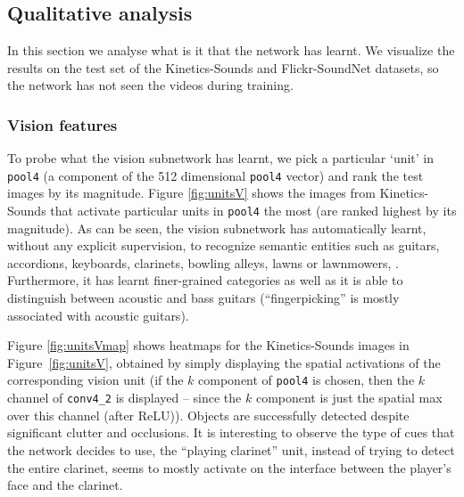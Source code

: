 \documentclass[10pt,twocolumn,letterpaper]{article}
\begin{document}
%

%
%
%


%
\subsection{Qualitative analysis}
\label{sec:resqual}

In this section we analyse what is it that the network has learnt.
We visualize the results on the test set of the Kinetics-Sounds and Flickr-SoundNet datasets,
so the network has not seen the videos during training.
%
%
%

\subsubsection{Vision features}
To probe what the vision subnetwork has learnt, we pick a particular `unit'
in \texttt{pool4} (\ie a component of the 512 dimensional \texttt{pool4} vector) and rank the test images by its magnitude.
Figure \ref{fig:unitsV} shows the images from Kinetics-Sounds that activate particular
units in \texttt{pool4} the most (\ie are ranked highest by its magnitude). As can be
seen, the vision subnetwork has automatically learnt, without any
explicit supervision, to recognize semantic entities such as guitars,
accordions, keyboards, clarinets, bowling alleys, lawns or lawnmowers,
\etc.  Furthermore, it has learnt finer-grained categories as well as
it is able to distinguish between acoustic and bass guitars
(``fingerpicking'' is mostly associated with acoustic guitars).

Figure \ref{fig:unitsVmap} shows heatmaps for the Kinetics-Sounds images in 
Figure~\ref{fig:unitsV}, obtained by simply displaying the spatial
activations of the corresponding vision unit (\ie if the $k$ component of
\texttt{pool4} is chosen, then the $k$ channel of \texttt{conv4\_2} is displayed -- since the $k$ component is just the spatial max over this channel 
(after ReLU)).
 Objects are successfully
detected despite significant clutter and occlusions.  It is
interesting to observe the type of cues that the network decides to
use, \eg the ``playing clarinet'' unit, instead of trying to detect
the entire clarinet, seems to mostly activate on the interface between
the player's face and the clarinet.

%
%
%
%
\end{document}

